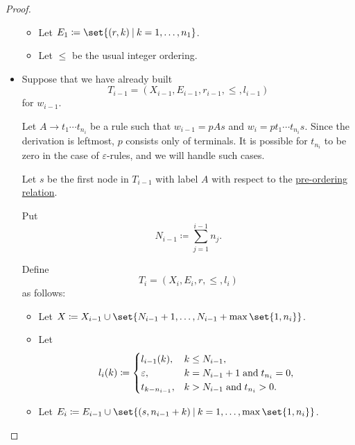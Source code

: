 \begin{proof}
\begin{itemize}
\begin{itemize}
      \item Let \( E_1 \coloneqq \set{ (r, k) \given k = 1, \ldots, n_1 } \).
      \item Let \( \leq \) be the usual integer ordering.
    \end{itemize}

    \item Suppose that we have already built
    \begin{equation*}
      T_{i-1} = (X_{i-1}, E_{i-1}, r_{i-1}, \leq, l_{i-1})
    \end{equation*}
    for \( w_{i-1} \).

    Let \( A \to t_1 \cdots t_{n_i} \) be a rule such that \( w_{i-1} = p A s \) and \( w_i = p t_1 \cdots t_{n_i} s \). Since the derivation is leftmost, \( p \) consists only of terminals. It is possible for \( t_{n_i} \) to be zero in the case of \( \varepsilon \)-rules, and we will handle such cases.

    Let \( s \) be the first node in \( T_{i-1} \) with label \( A \) with respect to the \hyperref[def:traversal_ordering]{pre-ordering relation}.

    Put
    \begin{equation*}
      N_{i-1} \coloneqq \sum_{j=1}^{i-1} n_j.
    \end{equation*}

    Define
    \begin{equation*}
      T_i = (X_i, E_i, r, \leq, l_i)
    \end{equation*}
    as follows:
    \begin{itemize}
      \item Let \( X \coloneqq X_{i-1} \cup \set{ N_{i-1} + 1, \ldots, N_{i-1} + \max\set{ 1, n_i } } \).
      \item Let
      \begin{equation*}
        l_i(k) \coloneqq \begin{cases}
          l_{i-1}(k),      &k \leq N_{i-1}, \\
          \varepsilon,     &k = N_{i-1} + 1 \T{and} t_{n_i} = 0, \\
          t_{k - n_{i-1}}, &k > N_{i-1} \T{and} t_{n_i} > 0.
        \end{cases}
      \end{equation*}

      \item Let \( E_i \coloneqq E_{i-1} \cup \set{ (s, n_{i-1} + k) \given k = 1, \ldots, \max\set{ 1, n_i } } \).
    \end{itemize}
  \end{itemize}


\end{proof}
